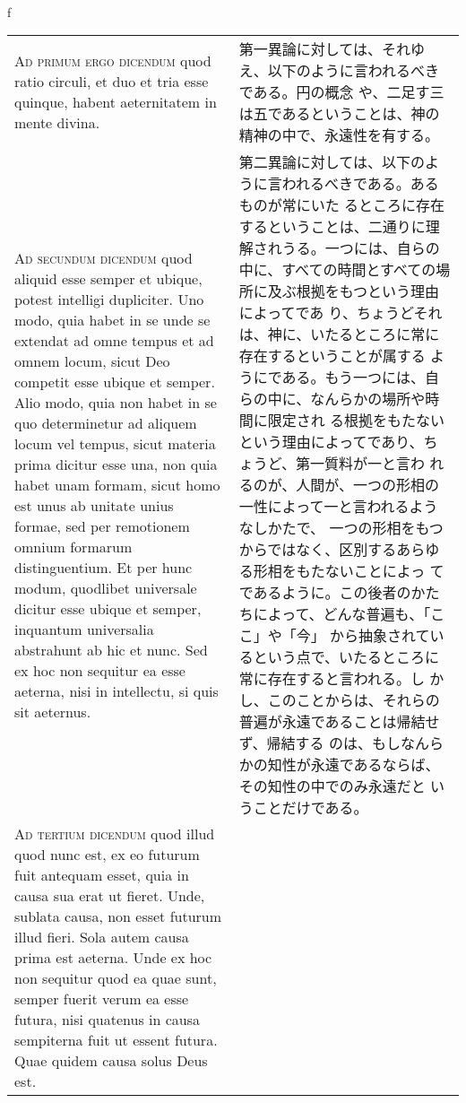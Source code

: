 \\f\documentclass[10pt]{jsarticle} %
\begin{document}
\begin{longtable}{p{21em}p{21em}}
\\


{\scshape Ad primum ergo dicendum} quod ratio circuli, et duo et tria
esse quinque, habent aeternitatem in mente divina.

&

第一異論に対しては、それゆえ、以下のように言われるべきである。円の概念
や、二足す三は五であるということは、神の精神の中で、永遠性を有する。


\\

{\scshape Ad secundum dicendum} quod aliquid esse semper et ubique,
potest intelligi dupliciter. Uno modo, quia habet in se unde se
extendat ad omne tempus et ad omnem locum, sicut Deo competit esse
ubique et semper. Alio modo, quia non habet in se quo determinetur ad
aliquem locum vel tempus, sicut materia prima dicitur esse una, non
quia habet unam formam, sicut homo est unus ab unitate unius formae,
sed per remotionem omnium formarum distinguentium. Et per hunc modum,
quodlibet universale dicitur esse ubique et semper, inquantum
universalia abstrahunt ab hic et nunc. Sed ex hoc non sequitur ea esse
aeterna, nisi in intellectu, si quis sit aeternus.

&

第二異論に対しては、以下のように言われるべきである。あるものが常にいた
るところに存在するということは、二通りに理解されうる。一つには、自らの
中に、すべての時間とすべての場所に及ぶ根拠をもつという理由によってであ
り、ちょうどそれは、神に、いたるところに常に存在するということが属する
ようにである。もう一つには、自らの中に、なんらかの場所や時間に限定され
る根拠をもたないという理由によってであり、ちょうど、第一質料が一と言わ
れるのが、人間が、一つの形相の一性によって一と言われるようなしかたで、
一つの形相をもつからではなく、区別するあらゆる形相をもたないことによっ
てであるように。この後者のかたちによって、どんな普遍も、「ここ」や「今」
から抽象されているという点で、いたるところに常に存在すると言われる。し
かし、このことからは、それらの普遍が永遠であることは帰結せず、帰結する
のは、もしなんらかの知性が永遠であるならば、その知性の中でのみ永遠だと
いうことだけである。


\\

{\scshape Ad tertium dicendum} quod illud quod nunc est, ex eo futurum
fuit antequam esset, quia in causa sua erat ut fieret. Unde, sublata
causa, non esset futurum illud fieri. Sola autem causa prima est
aeterna. Unde ex hoc non sequitur quod ea quae sunt, semper fuerit
verum ea esse futura, nisi quatenus in causa sempiterna fuit ut essent
futura. Quae quidem causa solus Deus est.


\end{longtable}
\end{document}
